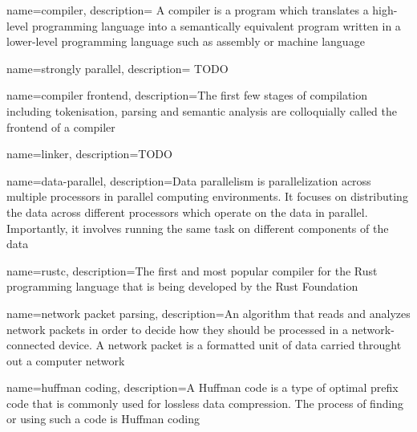 
\makeglossaries

\renewcommand*{\glstextformat}[1]{\textcolor{black}{%
\ul{\mbox{#1}}}}

{
    name=compiler,
    description={
    A compiler is a program which translates a high-level
programming language into a semantically equivalent program written in a
lower-level programming language such as assembly or machine language}
}

{
    name=strongly parallel,
    description={ TODO }
}

{
    name=compiler frontend,
    description={The first few stages of compilation including tokenisation,
parsing and semantic analysis are colloquially called the frontend of a compiler}
}

{
    name=linker,
    description={TODO}
}

{
    name=data-parallel,
    description={Data parallelism is parallelization across multiple processors
in parallel computing environments. It focuses on distributing the data across
different processors which operate on the data in parallel. Importantly, it
involves running the same task on different components of the data}
}

{
    name=rustc,
    description={The first and most popular compiler for the Rust programming
language that is being developed by the Rust Foundation}
}

 {
    name=network packet parsing,
    description={An algorithm that reads and analyzes network packets in order
to decide how they should be processed in a network-connected device. A network
packet is a formatted unit of data carried throught out a computer network}
}

{
    name=huffman coding,
    description={A Huffman code is a type of optimal prefix code that is
commonly used for lossless data compression. The process of finding or using
such a code is Huffman coding}
}







